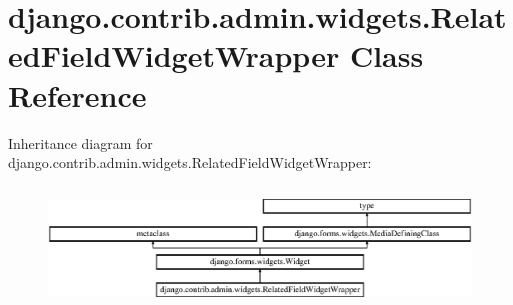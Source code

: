 \hypertarget{classdjango_1_1contrib_1_1admin_1_1widgets_1_1_related_field_widget_wrapper}{}\section{django.\+contrib.\+admin.\+widgets.\+Related\+Field\+Widget\+Wrapper Class Reference}
\label{classdjango_1_1contrib_1_1admin_1_1widgets_1_1_related_field_widget_wrapper}
Inheritance diagram for django.\+contrib.\+admin.\+widgets.\+Related\+Field\+Widget\+Wrapper\+:\begin{figure}[H]
\begin{center}
\leavevmode
\includegraphics[height=3.246377cm]{classdjango_1_1contrib_1_1admin_1_1widgets_1_1_related_field_widget_wrapper}
\end{center}
\end{figure}

